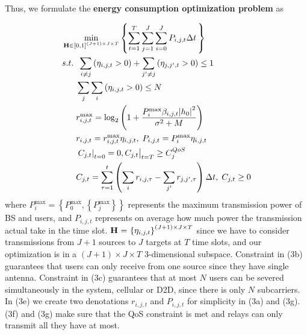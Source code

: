 \documentclass{ieeeaccess}
\begin{document}
Thus, we formulate the \textbf{energy consumption optimization problem} as

\begin{subequations}
\begin{align}
& \mathop {\min }\limits_{{\mathbf{{\rm H}}} \in {{\left[ {0,1} \right]}^{\left( {J + 1} \right) \times J \times T}}} \left\{ {\sum\limits_{t = 1}^T {\sum\limits_{j = 1}^J {\sum\limits_{i = 0}^J {{P_{i,j,t}}\Delta t} \,} } } \right\} \\
& {s.t.} \;\; \sum\limits_{i \ne j} {\left( {{\eta _{i,j,t}} > 0} \right)}  + \sum\limits_{j' \ne j} {\left( {{\eta _{j,j',t}} > 0} \right) \le {\text{1}}} \\
& \;\;\;\;\;\; \sum\limits_j {\sum\limits_i {\left( {{\eta _{i,j,t}} > 0} \right)} }  \le N \\
& \;\;\;\;\;\; r_{i,j,t}^{\max } = {\log _2}\left( {1 + \frac{{P_i^{\max }{\beta _{i,j,t}}{{\left| {{h_0}} \right|}^2}}}{{{\sigma ^2} + M}}} \right) \\
& \;\;\;\;\;\; {r_{i,j,t}} = r_{i,j,t}^{\max }{\eta _{i,j,t}},\; {P_{i,j,t}} = P_i^{\max }{\eta _{i,j,t}} \\
& \;\;\;\;\;\; {\left. {{{\left. {{C_{j,t}}} \right|}_{t = 0}} = 0, {C_{j,t}}} \right|_{t = T}} \ge C_j^{QoS} \\
& \;\;\;\;\;\; {C_{j,t}} = \sum\limits_{\tau  = 1}^t {\left( {\sum\limits_i {{r_{i,j,\tau }}}  - \sum\limits_{j'} {{r_{j,j',\tau }}} } \right)\Delta t} ,\; {C_{j,t}} \ge 0
\end{align}
\end{subequations}
where $P_i^{\max } = \left\{ {P_0^{\max },\left\{ {P_j^{\max }} \right\}} \right\}$ represents the maximum transmission power of BS and users, and ${P_{i,j,t}}$ represents on average how much power the transmission actual take in the time slot. ${\mathbf{{\rm H}}}{\text{ = }}{\left\{ {{\eta _{i,j,t}}} \right\}^{\left( {J + 1} \right) \times J \times T}}$ since we have to consider transmissions from ${J + 1}$ sources to $J$ targets at $T$ time slots, and our optimization is in a $\left( {J + 1} \right) \times J \times T$ 3-dimensional subspace. Constraint in (3b) guarantees that users can only receive from one source since they have single antenna. Constraint in (3c) guarantees that at most $N$ users can be severed simultaneously in the system, cellular or D2D, since there is only $N$ subcarriers. In (3e) we create two denotations ${r_{i,j,t}}$ and ${P_{i,j,t}}$ for simplicity in (3a) and (3g). (3f) and (3g) make sure that the QoS constraint is met and relays can only transmit all they have at most.
\end{document}
